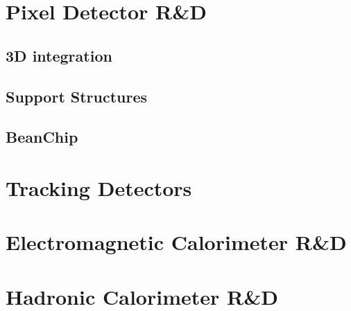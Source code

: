 \documentclass[10pt]{article}
\begin{document}
\section{Pixel Detector R\&D}


\subsection{3D integration}



\subsection{Support Structures}
\subsection{BeanChip}

\section{Tracking Detectors}



\section{Electromagnetic Calorimeter R\&D}


\section{Hadronic Calorimeter R\&D}


\end{document}
